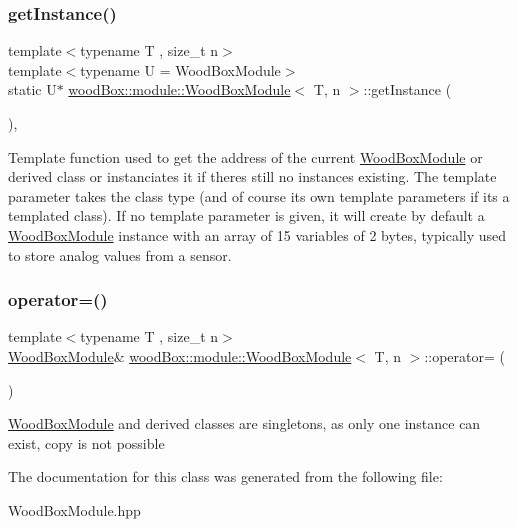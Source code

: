 \subsubsection{\texorpdfstring{get\+Instance()}{getInstance()}}
{\footnotesize\ttfamily template$<$typename T , size\+\_\+t n$>$ \\
template$<$typename U  = Wood\+Box\+Module$>$ \\
static U$\ast$ \mbox{\hyperlink{classwood_box_1_1module_1_1_wood_box_module}{wood\+Box\+::module\+::\+Wood\+Box\+Module}}$<$ T, n $>$\+::get\+Instance (\begin{DoxyParamCaption}{ }\end{DoxyParamCaption})\hspace{0.3cm}{\ttfamily [inline]}, {\ttfamily [static]}}

Template function used to get the address of the current \mbox{\hyperlink{classwood_box_1_1module_1_1_wood_box_module}{Wood\+Box\+Module}} or derived class or instanciates it if there\textquotesingle{}s still no instances existing. The template parameter takes the class type (and of course it\textquotesingle{}s own template parameters if it\textquotesingle{}s a templated class). If no template parameter is given, it will create by default a \mbox{\hyperlink{classwood_box_1_1module_1_1_wood_box_module}{Wood\+Box\+Module}} instance with an array of 15 variables of 2 bytes, typically used to store analog values from a sensor. \mbox{\label{classwood_box_1_1module_1_1_wood_box_module_acdae18f8e9e685cdbce5a4fc99956ab3}} 
\subsubsection{\texorpdfstring{operator=()}{operator=()}}
{\footnotesize\ttfamily template$<$typename T , size\+\_\+t n$>$ \\
\mbox{\hyperlink{classwood_box_1_1module_1_1_wood_box_module}{Wood\+Box\+Module}}\& \mbox{\hyperlink{classwood_box_1_1module_1_1_wood_box_module}{wood\+Box\+::module\+::\+Wood\+Box\+Module}}$<$ T, n $>$\+::operator= (\begin{DoxyParamCaption}\item[{const \mbox{\hyperlink{classwood_box_1_1module_1_1_wood_box_module}{Wood\+Box\+Module}}$<$ T, n $>$ \&}]{ }\end{DoxyParamCaption})\hspace{0.3cm}{\ttfamily [delete]}}

\mbox{\hyperlink{classwood_box_1_1module_1_1_wood_box_module}{Wood\+Box\+Module}} and derived classes are singletons, as only one instance can exist, copy is not possible 

The documentation for this class was generated from the following file\+:\begin{DoxyCompactItemize}
\item 
Wood\+Box\+Module.\+hpp\end{DoxyCompactItemize}
